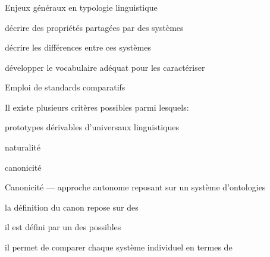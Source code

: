 \begin{frame}
\frametitle{}
\begin{wideitemize}
\item {Enjeux généraux en typologie linguistique}
\begin{smallwideitemize}
  \item {décrire des propriétés partagées par des systèmes}
  \item {décrire les différences entre ces systèmes}
  \item {développer le vocabulaire adéquat pour les caractériser}
\end{smallwideitemize}
\item {Emploi de standards comparatifs}
\begin{smallwideitemize}
\item {Il existe plusieurs critères possibles parmi lesquels:}
\begin{smallwideitemize}
  \item {prototypes dérivables d'universaux linguistiques \cite{greenberg63}}
  \item {naturalité \cite{wurzel84,dressler00}}
  \item {canonicité \cite{corbett03,corbett07b}}
\end{smallwideitemize}
\end{smallwideitemize}
\pause
\item Canonicité {\small --- approche autonome reposant sur un système
    d'ontologies}
\begin{smallwideitemize}
  \item la définition du canon repose sur des 
  \item il est défini par un  des possibles
  \item il permet de comparer chaque système individuel en
    termes de 
\end{smallwideitemize}
\end{wideitemize}
\end{frame}


